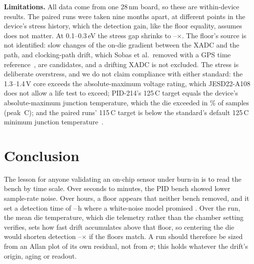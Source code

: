\documentclass[10pt,twocolumn]{article}
\newcommand{\degC}{\,\textdegree C}
\begin{document}
\textbf{Limitations.} All data come from one 28\,nm board, so these are within-device results. The paired runs were taken nine months apart, at different points in the device's stress history, which the detection gain, like the floor equality, assumes does not matter. At 0.1--0.3\,eV the stress gap shrinks to \vAFratioEaLo--\vAFratioEaHi$\times$. The floor's source is not identified: slow changes of the on-die gradient between the XADC and the path, and clocking-path drift, which Sobas et al.\ removed with a GPS time reference~\cite{sobas}, are candidates, and a drifting XADC is not excluded. The stress is deliberate overstress, and we do not claim compliance with either standard: the 1.3--1.4\,V core exceeds the absolute-maximum voltage rating, which JESD22-A108 does not allow a life test to exceed; PID-214's 125\degC{} target equals the device's absolute-maximum junction temperature, which the die exceeded in \vTjAbovePct\% of samples (peak \vTjPeak\degC); and the paired runs' 115\degC{} target is below the standard's default 125\degC{} minimum junction temperature~\cite{jedec}.


\section{Conclusion}

The lesson for anyone validating an on-chip sensor under burn-in is to read the bench by time scale. Over seconds to minutes, the PID bench showed lower sample-rate noise. Over hours, a floor appears that neither bench removed, and it set a detection time of \vDetLo--\vDetHi\,h where a white-noise model promised \vTminBound. Over the run, the mean die temperature, which die telemetry rather than the chamber setting verifies, sets how fast drift accumulates above that floor, so centering the die would shorten detection \vAFratioGainLo--\vAFratio$\times$ if the floors match. A run should therefore be sized from an Allan plot of its own residual, not from $\sigma$; this holds whatever the drift's origin, aging or readout.
\end{document}
